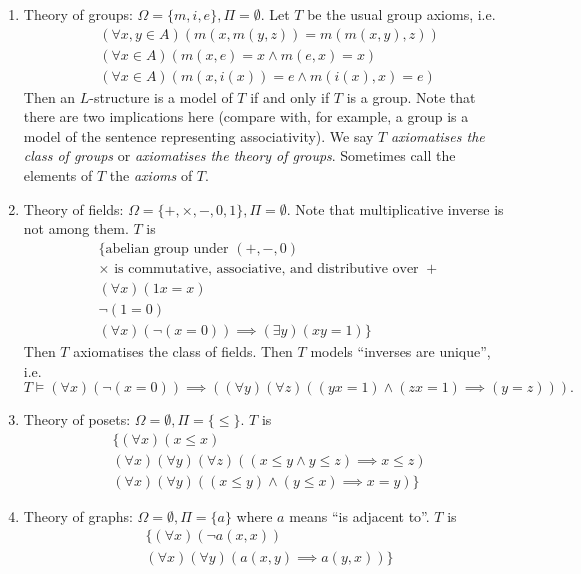 \documentclass[a4paper]{article}
\begin{document}
\begin{eg}\leavevmode
  \begin{enumerate}
  \item Theory of groups: \(\Omega = \{m, i, e\}, \Pi = \emptyset\). Let \(T\) be the usual group axioms, i.e.
    \begin{align*}
      & (\forall x, y \in A) (m(x, m(y, z)) = m(m(x, y), z)) \\
      & (\forall x \in A) (m(x, e) = x \land m(e, x) = x) \\
      & (\forall x \in A) (m(x, i(x)) = e \land m(i(x), x) = e)
    \end{align*}
    Then an \(L\)-structure is a model of \(T\) if and only if \(T\) is a group. Note that there are two implications here (compare with, for example, a group is a model of the sentence representing associativity). We say \(T\) \emph{axiomatises the class of groups} or \emph{axiomatises the theory of groups}. Sometimes call the elements of \(T\) the \emph{axioms} of \(T\).
  \item Theory of fields: \(\Omega = \{+, \times, -, 0, 1\}, \Pi = \emptyset\). Note that multiplicative inverse is not among them. \(T\) is
    \begin{align*}
      & \{ \text{abelian group under } (+, -, 0) \\
      & \times \text{ is commutative, associative, and distributive over } + \\
      & (\forall x) (1x = x) \\
      & \neg (1 = 0) \\
      & (\forall x) (\neg(x = 0)) \implies (\exists y)(xy = 1) \}
    \end{align*}
    Then \(T\) axiomatises the class of fields. Then \(T\) models ``inverses are unique'', i.e.
    \[
      T \models (\forall x) (\neg (x = 0)) \implies ((\forall y) (\forall z) ((yx = 1) \land (zx = 1) \implies (y = z))).
    \]
  \item Theory of posets: \(\Omega = \emptyset, \Pi = \{\leq\}\). \(T\) is
    \begin{align*}
      & \{ (\forall x) (x \leq x) \\
      & (\forall x) (\forall y) (\forall z) ((x \leq y \land y \leq z) \implies x \leq z) \\
      & (\forall x) (\forall y) ((x \leq y) \land (y \leq x) \implies x = y) \}
    \end{align*}
  \item Theory of graphs: \(\Omega = \emptyset, \Pi = \{a\}\) where \(a\) means ``is adjacent to''. \(T\) is
    \begin{align*}
      & \{ (\forall x) (\neg a(x, x)) \\
      & (\forall x) (\forall y) (a(x, y) \implies a(y, x)) \}
    \end{align*}
  \end{enumerate}
\end{eg}
\end{document}
